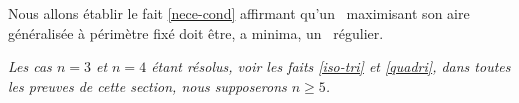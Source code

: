 Nous allons établir le fait \ref{nece-cond} affirmant qu'un \ncycle\ maximisant son aire généralisée à périmètre fixé doit être, a minima, un \ngone\ régulier.


\begin{tcolorbox}
	\itshape\small
	Les cas $n = 3$ et $n = 4$ étant résolus, voir les faits \ref{iso-tri} et \ref{quadri}, dans toutes les preuves de cette section, nous supposerons $n \geq 5 $.
\end{tcolorbox}





















